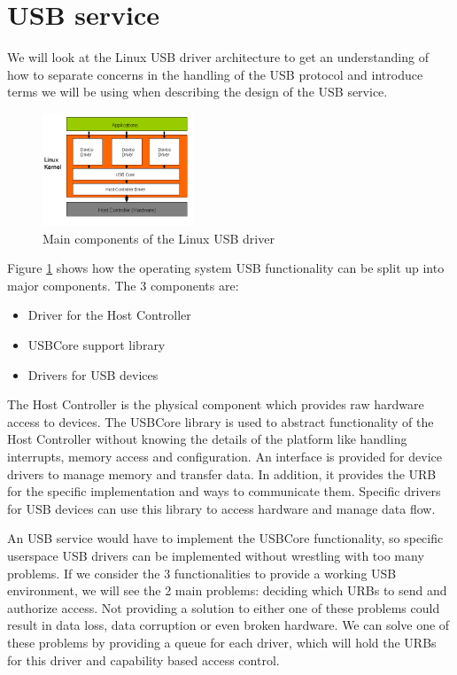 \documentclass{acm_proc_article-sp}
\begin{document}
\section{USB service}
\label{sec:serv}
We will look at the Linux USB driver architecture to get an understanding of how to separate concerns
in the handling of the USB protocol and introduce terms we will be using when describing the design
of the USB service.
\begin{figure}[!h]
\centering
\includegraphics[width=0.4\textwidth]{usblinux.png}
\caption{Main components of the Linux USB driver}
\label{fig:usblinux}
\end{figure}
Figure \ref{fig:usblinux} shows how the operating system USB functionality can be split up into
major components.
The 3 components are:
\begin{itemize}
\item Driver for the Host Controller
\item USBCore support library
\item Drivers for USB devices
\end{itemize}
The Host Controller is the physical component which provides raw hardware access to devices.
The USBCore library is used to abstract functionality of the Host Controller without knowing
the details of the platform like handling interrupts, memory access and configuration.
An interface is provided for device drivers to manage memory and transfer data.
In addition, it provides the URB for the specific implementation and ways to communicate them.
Specific drivers for USB devices can use this library to access hardware and manage data flow.

An USB service would have to implement the USBCore functionality, so specific userspace
USB drivers can be implemented without wrestling with too many problems.
If we consider the 3 functionalities to provide a working USB environment, we will see the 2
main problems: deciding which URBs to send and authorize access.
Not providing a solution to either one of these problems could result in data loss,
data corruption or even broken hardware.
We can solve one of these problems by providing a queue for each driver, which will hold the URBs
for this driver and capability based access control.
\end{document}
